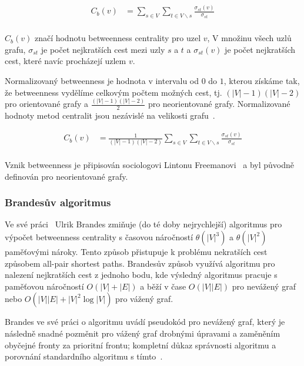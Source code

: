 \documentclass{bakalarka}
\begin{document}
\begin{align*}
C_b(v) &= \displaystyle\sum\limits_{s \in V} \displaystyle\sum\limits_{t \in V \backslash s} \frac{\sigma_{st}(v)}{\sigma_{st}} \\
\end{align*}

$C_b(v)$ značí hodnotu betweenness centrality pro uzel $v$, V množinu všech
uzlů grafu, $\sigma_{st}$ je počet nejkratších cest mezi uzly $s$ a $t$ a
$\sigma_{st}(v)$ je počet nejkratších cest, které navíc procházejí uzlem $v$.

Normalizovaný betweenness je hodnota v intervalu od $0$ do $1$, kterou získáme
tak, že betweenness vydělíme celkovým počtem možných cest, tj. $(|V| - 1)(|V| -
2)$ pro orientované grafy a $\frac{(|V| - 1)(|V| - 2)}{2}$ pro neorientované
grafy. Normalizované hodnoty metod centralit jsou nezávislé na velikosti
grafu~\citep{whiteborgatti1994}.

\begin{align*}
C_b(v) &= \frac{1}{(|V| - 1)(|V| - 2)} \displaystyle\sum\limits_{s \in V} \displaystyle\sum\limits_{t \in V \backslash s} \frac{\sigma_{st}(v)}{\sigma_{st}} \\
\end{align*}

Vznik betweenness je připisován sociologovi Lintonu
Freemanovi~\citep{freeman1977} a byl původně definován pro neorientované grafy.

\subsubsection{Brandesův algoritmus}
Ve své práci~\citep{brandes2001} Ulrik Brandes zmiňuje (do té doby
nejrychlejší) algoritmus pro výpočet betweenness centrality s časovou
náročností $\theta(|V|^3)$ a $\theta(|V|^2)$ paměťovými nároky. Tento způsob
přistupuje k problému nekratších cest způsobem all-pair shortest paths.
Brandesův způsob využívá algoritmu pro nalezení nejkratších cest z jednoho
bodu, kde výsledný algoritmus pracuje s paměťovou náročností $O(|V| + |E|)$ a
běží v čase $O(|V||E|)$ pro nevážený graf nebo $O(|V||E| + |V|^2 \log|V|)$ pro
vážený graf. 


Brandes ve své práci o algoritmu uvádí pseudokód pro nevážený graf, který je
následně snadné pozměnit pro vážený graf drobnými úpravami a zaměněním obyčejné
fronty za prioritní frontu; kompletní důkaz správnosti algoritmu a porovnání
standardního algoritmu s tímto~\citep{brandes2001}.
\end{document}
